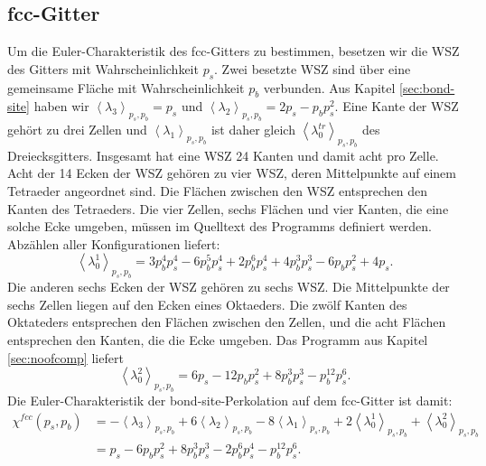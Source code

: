 \subsection{fcc-Gitter}
Um die Euler-Charakteristik des fcc-Gitters zu bestimmen, besetzen wir die WSZ des Gitters mit Wahrscheinlichkeit $p_s$. Zwei besetzte WSZ sind \"uber eine gemeinsame Fl\"ache mit Wahrscheinlichkeit $p_b$ verbunden. Aus Kapitel \ref{sec:bond-site} haben wir $\left<\lambda_3\right>_{p_s,p_b}=p_s$ und $\left<\lambda_2\right>_{p_s,p_b}=2p_s-p_bp_s^2$. Eine Kante der WSZ geh\"ort zu drei Zellen und $\left<\lambda_1\right>_{p_s,p_b}$ ist daher gleich $\left< \lambda_0^{tr} \right>_{p_s,p_b}$ des Dreiecksgitters. Insgesamt hat eine WSZ 24 Kanten und damit acht pro Zelle. 
\\Acht der 14 Ecken der WSZ geh\"oren zu vier WSZ, deren Mittelpunkte auf einem Tetraeder angeordnet sind. Die Fl\"achen zwischen den WSZ entsprechen den Kanten des Tetraeders. Die vier Zellen, sechs Fl\"achen und vier Kanten, die eine solche Ecke umgeben, m\"ussen im Quelltext des Programms definiert werden. Abz\"ahlen aller Konfigurationen liefert:
\begin{equation}
\left<\lambda_0^1\right>_{p_s,p_b} = 3p_b^4p_s^4-6p_b^5p_s^4+2p_b^6p_s^4+4p_b^3p_s^3-6p_bp_s^2+4p_s.
\end{equation}
Die anderen sechs Ecken der WSZ geh\"oren zu sechs WSZ. Die Mittelpunkte der sechs Zellen liegen auf den Ecken eines Oktaeders. Die zw\"olf Kanten des Oktateders entsprechen den Fl\"achen zwischen den Zellen, und die acht Fl\"achen entsprechen den Kanten, die die Ecke umgeben. Das Programm aus Kapitel \ref{sec:noofcomp} liefert
\begin{equation}
\left<\lambda_0^2\right>_{p_s,p_b} =6p_s-12p_bp_s^2+8p_b^3p_s^3-p_b^{12}p_s^6.
\end{equation}
Die Euler-Charakteristik der bond-site-Perkolation auf dem fcc-Gitter ist damit: 
\begin{equation}
  \begin{split} \chi^{fcc}(p_s,p_b)& = -\left<\lambda_3\right>_{p_s,p_b}+6\left<\lambda_2\right>_{p_s,p_b}-8\left< \lambda_1 \right>_{p_s,p_b}+2\left<\lambda_0^1\right>_{p_s,p_b}+\left<\lambda_0^2\right>_{p_s,p_b}\\
& =p_s-6p_bp_s^2+8p_b^3p_s^3-2p_b^6p_s^4-p_b^{12}p_s^6.
\end{split}
\end{equation}


